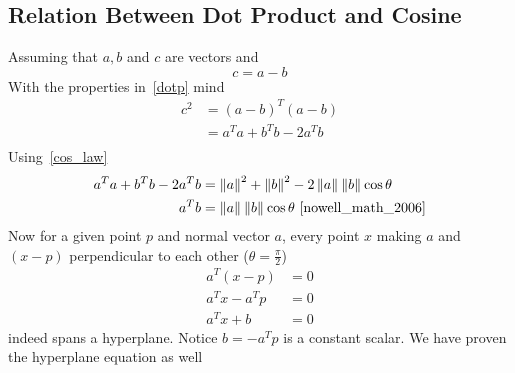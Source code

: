 \documentclass{article}
\newcommand{\norm}[2][]{\left\lVert#2\right\rVert_{#1}}
\numberwithin{equation}{subsection}
\begin{document}
\subsection{Relation Between Dot Product and Cosine} 
Assuming that $a, b$ and $c$ are vectors and
\begin{equation}
    c = a-b
\end{equation} 
With the properties in~\ref{dotp} mind
\begin{align}
    c^2 &= (a-b)^T(a-b)\\
    &= a^Ta +b^Tb - 2a^Tb\\
\end{align}
Using~\ref{cos_law}
\begin{align}
    a^Ta +b^Tb - 2a^Tb &= \norm{a}^2 + \norm{b}^2 - 2\norm{a}\norm{b}\cos \theta\\
    a^Tb &= \norm{a}\norm{b}\cos \theta~\cite{nowell_math_2006}
\end{align}
Now for a given point $p$ and normal vector $a$, every point $x$ making $a$ and $(x-p)$ perpendicular to each other ($\theta = \frac{\pi}{2}$) 
\begin{align}
    a^T(x-p) &= 0\\
    a^Tx-a^Tp &= 0\\
    a^Tx+b &= 0
\end{align}
indeed spans a hyperplane. Notice $b = -a^Tp$ is a constant scalar. We have proven the hyperplane equation as well
\end{document}
